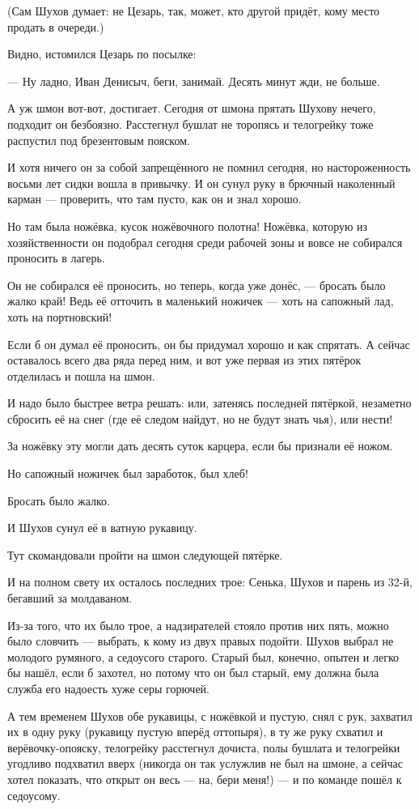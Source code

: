 (Сам Шухов думает: не Цезарь, так, может, кто другой придёт, кому место продать в очереди.)

Видно, истомился Цезарь по посылке:

--- Ну ладно, Иван Денисыч, беги, занимай. Десять минут жди, не больше.

А уж шмон вот-вот, достигает. Сегодня от шмона прятать Шухову нечего, подходит он безбоязно.
Расстегнул бушлат не торопясь и телогрейку тоже распустил под брезентовым пояском.

И хотя ничего он за собой запрещённого не помнил сегодня, но настороженность восьми лет
сидки вошла в привычку. И он сунул руку в брючный наколенный карман --- проверить, что там
пусто, как он и знал хорошо.

Но там была ножёвка, кусок ножёвочного полотна! Ножёвка, которую из хозяйственности он
подобрал сегодня среди рабочей зоны и вовсе не собирался проносить в лагерь.

Он не собирался её проносить, но теперь, когда уже донёс, --- бросать было жалко край! Ведь её
отточить в маленький ножичек --- хоть на сапожный лад, хоть на портновский!

Если б он думал её проносить, он бы придумал хорошо и как спрятать. А сейчас оставалось всего
два ряда перед ним, и вот уже первая из этих пятёрок отделилась и пошла на шмон.

И надо было быстрее ветра решать: или, затенясь последней пятёркой, незаметно сбросить её на
снег (где её следом найдут, но не будут знать чья), или нести!

За ножёвку эту могли дать десять суток карцера, если бы признали её ножом.

Но сапожный ножичек был заработок, был хлеб!

Бросать было жалко.

И Шухов сунул её в ватную рукавицу.

Тут скомандовали пройти на шмон следующей пятёрке.

И на полном свету их осталось последних трое: Сенька, Шухов и парень из 32-й, бегавший за
молдаваном.

Из-за того, что их было трое, а надзирателей стояло против них пять, можно было словчить ---
выбрать, к кому из двух правых подойти. Шухов выбрал не молодого румяного, а седоусого
старого. Старый был, конечно, опытен и легко бы нашёл, если б захотел, но потому что он был
старый, ему должна была служба его надоесть хуже серы горючей.

А тем временем Шухов обе рукавицы, с ножёвкой и пустую, снял с рук, захватил их в одну руку
(рукавицу пустую вперёд оттопыря), в ту же руку схватил и верёвочку-опояску, телогрейку
расстегнул дочиста, полы бушлата и телогрейки угодливо подхватил вверх (никогда он так
услужлив не был на шмоне, а сейчас хотел показать, что открыт он весь --- на, бери меня!) --- и по
команде пошёл к седоусому.

